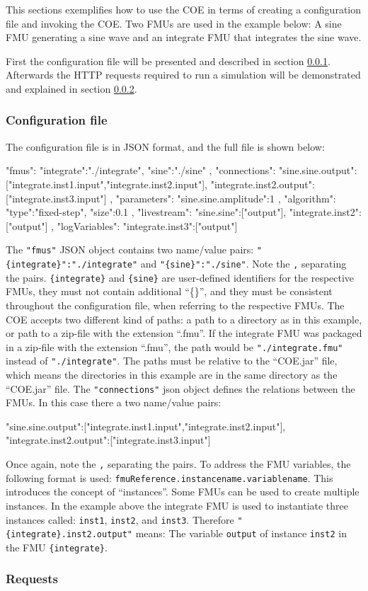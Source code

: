 This sections exemplifies how to use the COE in terms of creating a configuration file and invoking the COE. Two FMUs are used in the example below: A sine FMU generating a sine wave and an integrate FMU that integrates the sine wave.

First the configuration file will be presented and described in section \ref{subsubsec:configurationFile}. Afterwards the HTTP requests required to run a simulation will be demonstrated and explained in section \ref{subsubsec:requests}.
%
%
%
%
\subsubsection{Configuration file}\label{subsubsec:configurationFile}
The configuration file is in JSON format, and the full file is shown below:
%
%
%
\begin{json}
	{
		"fmus":{
			"{integrate}":"./integrate",
			"{sine}":"./sine"
		},
		"connections":{
			"{sine}.sine.output":["{integrate}.inst1.input","{integrate}.inst2.input"],
			"{integrate}.inst2.output":["{integrate}.inst3.input"]
		},
		"parameters":{
			"{sine}.sine.amplitude":1
		},
		"algorithm":{
			"type":"fixed-step",
			"size":0.1
		},
		"livestream":{
			"{sine}.sine":["output"],
			"{integrate}.inst2":["output"]
		},
		"logVariables":{
			"{integrate}.inst3":["output"]
		}
	}
\end{json}
The \texttt{"fmus"} JSON object contains two name/value pairs: \texttt{"\{integrate\}":"./integrate"} and \texttt{"\{sine\}":"./sine"}. Note the \texttt{,} separating the pairs. \texttt{\{integrate\}} and \texttt{\{sine\}} are user-defined identifiers for the respective FMUs, they must not contain additional ``\{\}'', and they must be consistent throughout the configuration file, when referring to the respective FMUs. The COE accepts two different kind of paths: a path to a directory as in this example, or path to a zip-file with the extension ``.fmu''. If the integrate FMU was packaged in a zip-file with the extension ``.fmu'', the path would be \texttt{"./integrate.fmu"} instead of \texttt{"./integrate"}. The paths must be relative to the ``COE.jar'' file, which means the directories in this example are in the same directory as the ``COE.jar'' file. 
%
%
%
The \texttt{"connections"} json object defines the relations between the FMUs. In this case there a two name/value pairs:
\begin{json}
"{sine}.sine.output":["{integrate}.inst1.input","{integrate}.inst2.input"],
"{integrate}.inst2.output":["{integrate}.inst3.input"]
\end{json}
Once again, note the \texttt{,} separating the pairs. To address the FMU variables, the following format is used: \texttt{fmuReference.instancename.variablename}. This introduces the concept of ``instances''. Some FMUs can be used to create multiple instances. In the example above the integrate FMU is used to instantiate three instances called: \texttt{inst1}, \texttt{inst2}, and \texttt{inst3}. Therefore \texttt{"\{integrate\}.inst2.output"} means: The variable \texttt{output} of instance \texttt{inst2} in the FMU \texttt{\{integrate\}}.
%
%
%
%
\subsubsection{Requests}\label{subsubsec:requests}
